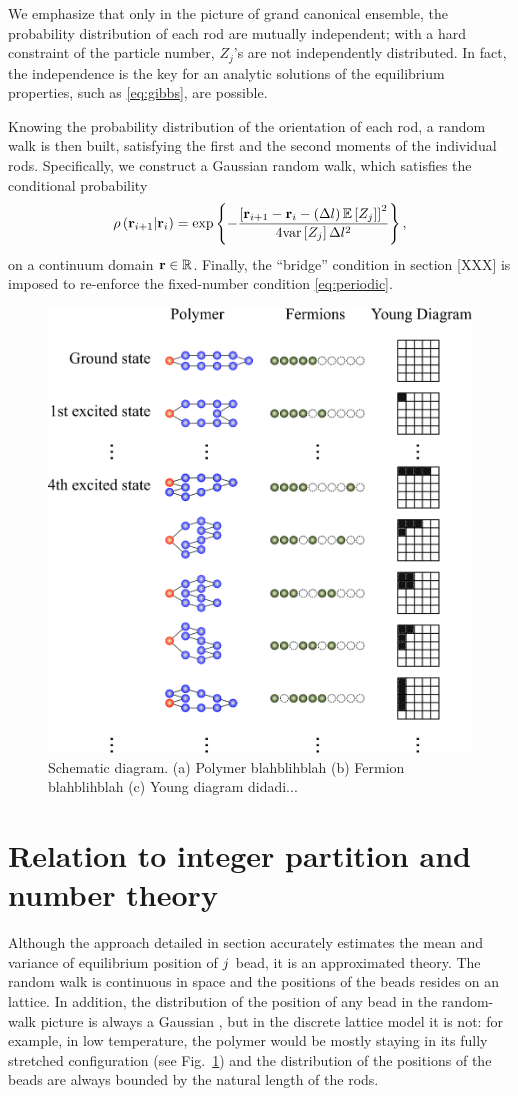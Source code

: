 \documentclass[twocolumn,showpacs,preprintnumbers,amsmath,amssymb,pre]{revtex4-1}
\newcommand{\E}[1]{\mathbb{E}\left[#1\right]}
\newcommand{\var}[1]{\text{var} \left[ #1 \right]}
\renewcommand{\l}{\left}
\renewcommand{\r}{\right}
\newcommand{\eq}[2]{\begin{equation}#1\label{#2}\end{equation}}
\begin{document}
We emphasize that only in the picture of grand canonical ensemble, the probability distribution of each rod are mutually independent; with a hard constraint of the particle number, $Z_j$'s are not independently distributed. In fact, the independence is the key for an analytic solutions of the equilibrium properties, such as \eqref{eq:gibbs}, are possible. 

Knowing the probability distribution of the orientation of each rod, a random walk is then built, satisfying the first and the second moments of the individual rods. Specifically, we construct a Gaussian random walk, which satisfies the conditional probability
\eq{
\rho\l(\vx_{i+1} \vert \vx_i\r) =\exp\l\{ -\frac{\l[\vx_{i+1}- \vx_i - \l(\Delta l \r) \E{Z_j}\r]^2}{4 \var{Z_j}\Delta l^2}\r\}, 
}{}
on a continuum domain ${\bf r} \in \mathbb{R}$. Finally, the ``bridge'' condition in section [XXX] is imposed to re-enforce the fixed-number condition \eqref{eq:periodic}. 

\begin{figure}
\includegraphics[width=0.45 \textwidth]{schematic.eps}
\caption{Schematic diagram. (a) Polymer blahblihblah (b) Fermion blahblihblah (c) Young diagram didadi...}
\label{fig:schematic}
\end{figure}

\section{Relation to integer partition and number theory} \label{sec:partition} 
Although the approach detailed in section \label{sec:FD} accurately estimates the mean and variance of equilibrium position of $j^{\rm}$ bead, it is an approximated theory. The random walk is continuous in space and the positions of the beads resides on an lattice. In addition, the distribution of the position of any bead in the random-walk picture is always a Gaussian \cite{klebaner2005introduction}, but in the discrete lattice model it is not: for example, in low temperature, the polymer would be mostly staying in its fully stretched configuration (see Fig.~\ref{fig:schematic}) and the distribution of the positions of the beads are always bounded by the natural length of the rods. 
\end{document}
